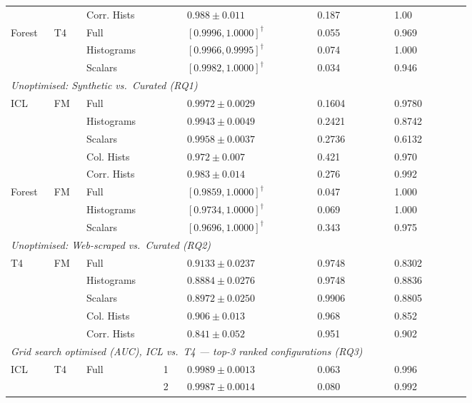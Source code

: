 \documentclass{article}
\begin{document}
\begin{table}[ht]
\begin{tabular}{p{0.05\linewidth} p{0.05\linewidth} p{0.13\linewidth} p{0.04\linewidth} p{0.22\linewidth} p{0.13\linewidth} p{0.13\linewidth}}
 && Corr. Hists && $0.988 \pm 0.011$ & 0.187 & 1.00 \\
\cmidrule(lr){1-7}
\multirow{3}{*}{Forest} & \multirow{3}{*}{T4}
 & Full        & & $[0.9996, 1.0000]^\dagger$ & 0.055 & 0.969 \\
 && Histograms   & & $[0.9966, 0.9995]^\dagger$ & 0.074 & 1.000 \\
 && Scalars & & $[0.9982, 1.0000]^\dagger$ & 0.034 & 0.946 \\
\midrule
\multicolumn{7}{l}{\textit{Unoptimised: Synthetic vs.\ Curated (RQ1)}} \\
\midrule
\multirow{3}{*}{ICL} & \multirow{3}{*}{FM}
 & Full        & & $0.9972 \pm 0.0029$ & 0.1604 & 0.9780 \\
 && Histograms   & & $0.9943 \pm 0.0049$ & 0.2421 & 0.8742 \\
 && Scalars & & $0.9958 \pm 0.0037$ & 0.2736 & 0.6132 \\
\cmidrule(lr){3-7}
 && Col. Hists && $0.972 \pm 0.007$ & 0.421 & 0.970 \\
 && Corr. Hists && $0.983 \pm 0.014$ & 0.276 & 0.992 \\
\cmidrule(lr){1-7}
\multirow{3}{*}{Forest} & \multirow{3}{*}{FM}
 & Full        & & $[0.9859, 1.0000]^\dagger$ & 0.047 & 1.000 \\
 && Histograms   & & $[0.9734, 1.0000]^\dagger$ & 0.069 & 1.000 \\
 && Scalars & & $[0.9696, 1.0000]^\dagger$ & 0.343 & 0.975 \\
\midrule
\multicolumn{7}{l}{\textit{Unoptimised: Web-scraped vs.\ Curated (RQ2)}} \\
\midrule
\multirow{3}{*}{T4} & \multirow{3}{*}{FM}
 & Full        & & $0.9133 \pm 0.0237$ & 0.9748 & 0.8302 \\
 && Histograms   & & $0.8884 \pm 0.0276$ & 0.9748 & 0.8836 \\
 && Scalars & & $0.8972 \pm 0.0250$ & 0.9906 & 0.8805 \\
\cmidrule(lr){3-7}
 && Col. Hists && $0.906 \pm 0.013$ & 0.968 & 0.852 \\
 && Corr. Hists && $0.841 \pm 0.052$ & 0.951 & 0.902 \\
\midrule
\multicolumn{7}{l}{\textit{Grid search optimised (AUC), ICL vs.\ T4 --- top-3 ranked configurations (RQ3)}} \\
\midrule
\multirow{3}{*}{ICL} & \multirow{3}{*}{T4} & \multirow{3}{*}{Full}
 & 1 & $0.9989 \pm 0.0013$ & 0.063 & 0.996 \\
 &&& 2 & $0.9987 \pm 0.0014$ & 0.080 & 0.992 \\

\end{tabular}
\end{table}
\end{document}
